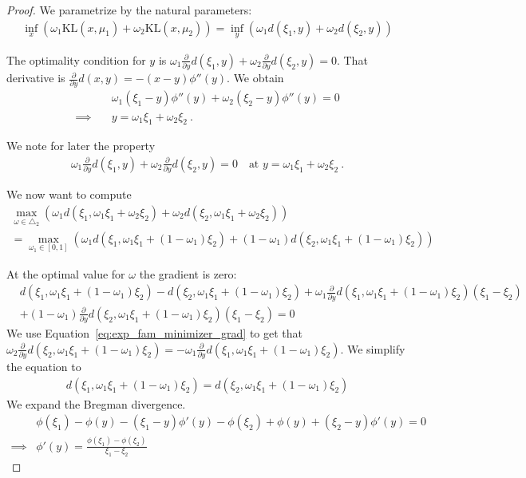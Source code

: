 \documentclass{article}
\newcommand{\KL}{\mathrm{KL}}
\begin{document}
\begin{proof}
We parametrize by the natural parameters:
\begin{align*}
\inf_{x} (\omega_1 \KL(x, \mu_1) + \omega_2 \KL(x, \mu_2))
= \inf_{y} (\omega_1 d(\xi_1, y) + \omega_2 d(\xi_2, y))
\end{align*}

The optimality condition for $y$ is $\omega_1 \frac{\partial}{\partial y}d(\xi_1, y) + \omega_2 \frac{\partial}{\partial y}d(\xi_2, y) = 0$. That derivative is $\frac{\partial}{\partial y}d(x, y) = - (x - y)\phi''(y)$. We obtain
\begin{align*}
&\omega_1 (\xi_1 - y)\phi''(y) + \omega_2 (\xi_2 - y)\phi''(y) = 0
\\
\implies \quad &y = \omega_1 \xi_1 + \omega_2 \xi_2 \: .
\end{align*}

We note for later the property
\begin{align}\label{eq:exp_fam_minimizer_grad}
\omega_1 \frac{\partial}{\partial y}d(\xi_1, y) + \omega_2 \frac{\partial}{\partial y}d(\xi_2, y) = 0 \quad \text{at } y = \omega_1 \xi_1 + \omega_2 \xi_2 \: .
\end{align}

We now want to compute
\begin{align*}
\max_{\omega \in \triangle_2} (\omega_1 d(\xi_1, \omega_1 \xi_1 + \omega_2 \xi_2) + \omega_2 d(\xi_2, \omega_1 \xi_1 + \omega_2 \xi_2))
\\
=\max_{\omega_1 \in [0,1]} (\omega_1 d(\xi_1, \omega_1 \xi_1 + (1 - \omega_1) \xi_2) + (1 - \omega_1) d(\xi_2, \omega_1 \xi_1 + (1 - \omega_1) \xi_2))
\end{align*}

At the optimal value for $\omega$ the gradient is zero:
\begin{align*}
&d(\xi_1, \omega_1 \xi_1 + (1 - \omega_1) \xi_2) - d(\xi_2, \omega_1 \xi_1 + (1 - \omega_1) \xi_2)
	+ \omega_1 \frac{\partial}{\partial y} d(\xi_1, \omega_1 \xi_1 + (1 - \omega_1) \xi_2) (\xi_1 - \xi_2)
	\\&+ (1 - \omega_1) \frac{\partial}{\partial y} d(\xi_2, \omega_1 \xi_1 + (1 - \omega_1) \xi_2) (\xi_1 - \xi_2)
= 0
\end{align*}
We use Equation~\eqref{eq:exp_fam_minimizer_grad} to get that $\omega_2 \frac{\partial}{\partial y} d(\xi_2, \omega_1 \xi_1 + (1 - \omega_1) \xi_2) = - \omega_1 \frac{\partial}{\partial y} d(\xi_1, \omega_1 \xi_1 + (1 - \omega_1) \xi_2)$. We simplify the equation to
\begin{align*}
d(\xi_1, \omega_1 \xi_1 + (1 - \omega_1) \xi_2)
= d(\xi_2, \omega_1 \xi_1 + (1 - \omega_1) \xi_2)
\end{align*}
We expand the Bregman divergence.
\begin{align*}
&\phi(\xi_1) - \phi(y) - (\xi_1 - y) \phi'(y) - \phi(\xi_2) + \phi(y) + (\xi_2 - y) \phi'(y) = 0
\\
\implies &\phi'(y) = \frac{\phi(\xi_1) - \phi(\xi_2)}{\xi_1 - \xi_2}
\end{align*}


\end{proof}
\end{document}

